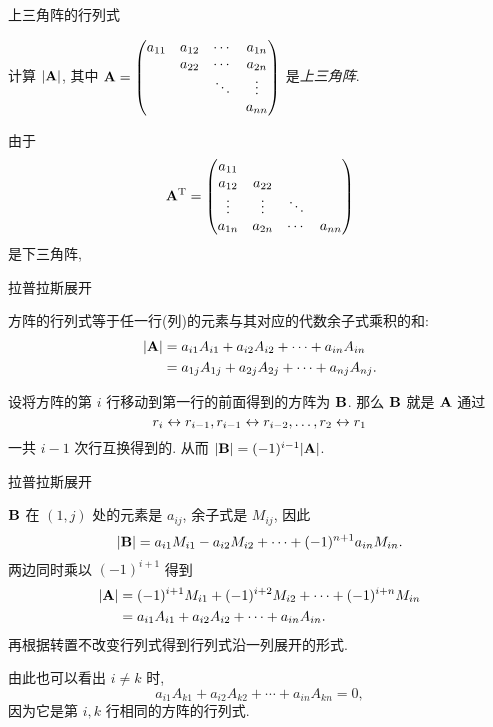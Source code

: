 \begin{frame}{上三角阵的行列式}
	\onslide<+->
	\begin{example}
		计算 $|{\mathbf{A}}|$, 其中 ${\mathbf{A}}=\begin{pmatrix}
			a_{11}&a_{12}&\cdots&a_{1n}\\
			      &a_{22}&\cdots&a_{2n}\\
						&			 &\ddots&\vdots\\
						&			 &     	&a_{nn}
		\end{pmatrix}$ 是\emph{上三角阵}.
	\end{example}
	\onslide<+->
	\begin{solution}
		由于
		\[{\mathbf{A}}^{\mathrm{T}}=\begin{pmatrix}
			a_{11}&      &      &\\
			a_{12}&a_{22}&      &\\
			\vdots&\vdots&\ddots&\\
			a_{1n}&a_{2n}&\cdots&a_{nn}
		\end{pmatrix}\]
		是下三角阵,
		\onslide<+->{因此
		$|\bfA|=|\bfA^\rmT|=a_{11}a_{22}\cdots a_{nn}.$}
	\end{solution}
\end{frame}


\begin{frame}{拉普拉斯展开}
	\onslide<+->
	\begin{theorem}
		方阵的行列式等于任一行(列)的元素与其对应的代数余子式乘积的和:
		\begin{align*}
			|{\mathbf{A}}|&=a_{i1}A_{i1}+a_{i2}A_{i2}+\cdots+a_{in}A_{in}\\
			&=a_{1j}A_{1j}+a_{2j}A_{2j}+\cdots+a_{nj}A_{nj}.
		\end{align*}
	\end{theorem}
	\onslide<+->
	\begin{proofs}
	设将方阵的第 $i$ 行移动到第一行的前面得到的方阵为 ${\mathbf{B}}$.
	\onslide<+->
	那么 ${\mathbf{B}}$ 就是 ${\mathbf{A}}$ 通过
	\[r_i\leftrightarrow r_{i-1}, r_{i-1}\leftrightarrow r_{i-2},\dots,r_2\leftrightarrow r_1\]
	\onslide<+->
	一共 $i-1$ 次行互换得到的.
	\onslide<+->
	从而 $|{\mathbf{B}}|=(-1)^{i-1}|{\mathbf{A}}|$.
	\end{proofs}
\end{frame}


\begin{frame}{拉普拉斯展开}
	\onslide<+->
	\begin{proofe}
	${\mathbf{B}}$ 在 $(1,j)$ 处的元素是 $a_{ij}$, 余子式是 $M_{ij}$, 因此
	\[|{\mathbf{B}}|=a_{i1}M_{i1}-a_{i2}M_{i2}+\cdots+(-1)^{n+1}a_{in}M_{in}.\]
	\onslide<+->
	两边同时乘以 $(-1)^{i+1}$ 得到
	\begin{align*}
		|{\mathbf{A}}|&=(-1)^{i+1}M_{i1}+(-1)^{i+2}M_{i2}+\cdots+(-1)^{i+n}M_{in}\\
		&=a_{i1}A_{i1}+a_{i2}A_{i2}+\cdots+a_{in}A_{in}.
	\end{align*}
	\onslide<+->
	再根据转置不改变行列式得到行列式沿一列展开的形式.
	\end{proofe}
	
	\onslide<+->
	由此也可以看出 $i\neq k$ 时,
	\[a_{i1}A_{k1}+a_{i2}A_{k2}+\cdots+a_{in}A_{kn}=0,\]
	\onslide<+->
	因为它是第 $i,k$ 行相同的方阵的行列式.
\end{frame}


